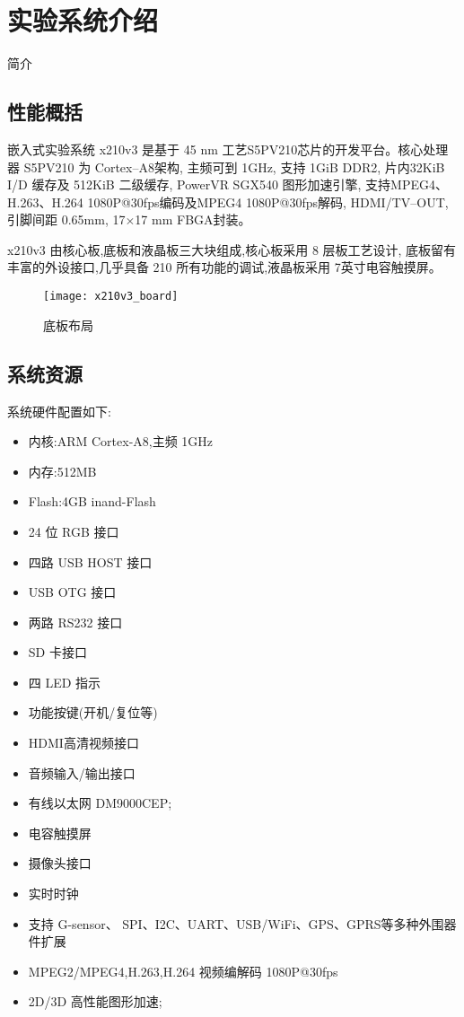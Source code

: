 \chapter{实验系统介绍}{简介}

\section{性能概括}

嵌入式实验系统 x210v3 是基于 45 nm 工艺S5PV210芯片的开发平台。核心处理器
S5PV210 为 Cortex--A8架构, 主频可到 1GHz, 支持 1GiB DDR2, 片内32KiB I/D 缓存及
512KiB 二级缓存, PowerVR SGX540 图形加速引擎, 支持MPEG4、H.263、H.264 
1080P@30fps编码及MPEG4 1080P@30fps解码, HDMI/TV--OUT, 引脚间距 0.65mm, 
17$\times$17 mm FBGA封装。

x210v3 由核心板,底板和液晶板三大块组成,核心板采用 8 层板工艺设计,  底板留有
丰富的外设接口,几乎具备 210 所有功能的调试,液晶板采用 7英寸电容触摸屏。

\begin{figure}[!ht]
\centering
\texttt{[image: x210v3\_board]}
\caption{底板布局}
\end{figure}

\section{系统资源}

	系统硬件配置如下:

\begin{itemize}
  \item 内核:ARM Cortex-A8,主频 1GHz
  \item 内存:512MB
  \item Flash:4GB inand-Flash
  \item 24 位 RGB 接口
  \item 四路 USB HOST 接口
  \item USB OTG 接口
  \item 两路 RS232 接口
  \item SD 卡接口
  \item 四 LED 指示
  \item 功能按键(开机/复位等)
  \item HDMI高清视频接口
  \item 音频输入/输出接口
  \item 有线以太网 DM9000CEP;
  \item 电容触摸屏
  \item 摄像头接口
  \item 实时时钟
  \item 支持 G-sensor、 SPI、I2C、UART、USB/WiFi、GPS、GPRS等多种外围器件扩展
  \item MPEG2/MPEG4,H.263,H.264 视频编解码 1080P@30fps
  \item 2D/3D 高性能图形加速;
\end{itemize}


